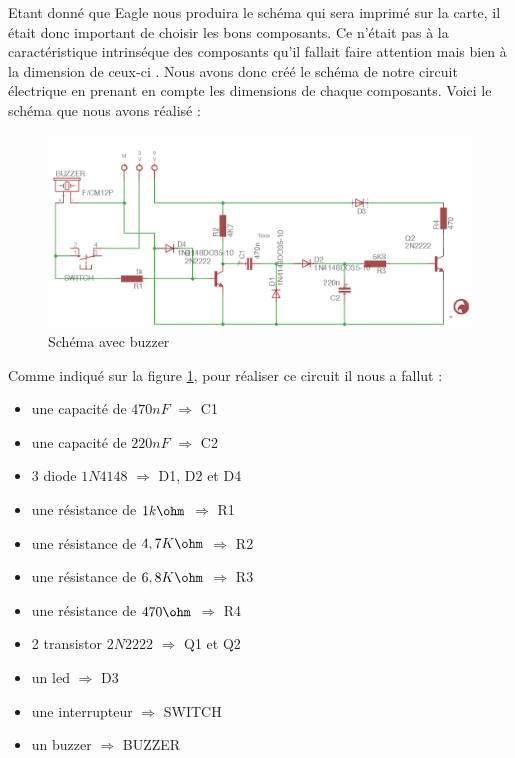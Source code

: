 Etant donné que Eagle nous produira le schéma qui sera imprimé sur la carte, il était donc important de choisir les bons composants. Ce n'était pas à la caractéristique intrinséque des composants qu'il fallait faire attention mais bien à la dimension de ceux-ci . Nous avons donc créé le schéma de notre circuit électrique en prenant en compte les dimensions de chaque composants. Voici le schéma que nous avons réalisé : 


\begin{figure}[H]
\centering
\includegraphics[width=1\textwidth]{ressources/schema_final}
\caption{Schéma avec buzzer}
\label{schemaEagle}
\end{figure}

Comme indiqué sur la figure \ref{schemaEagle}, pour réaliser ce circuit il nous a fallut :
\begin{itemize}
	\item une capacité de \textbf{$470 nF$} $\Rightarrow$ C1
	\item une capacité de \textbf{$220 nF$}  $\Rightarrow$ C2
	\item 3 diode \textbf{$1N4148$} $\Rightarrow$ D1, D2 et D4
	\item une résistance de \textbf{$ 1k\ohm $} $\Rightarrow$ R1
	\item  une résistance de \textbf{$ 4,7K\ohm $} $\Rightarrow$ R2
	\item  une résistance de \textbf{$ 6,8K\ohm $} $\Rightarrow$ R3
	\item une résistance de \textbf{$470\ohm $} $\Rightarrow$ R4
	\item 2 transistor  \textbf{$2N2222 $} $\Rightarrow$ Q1 et Q2
	\item un led $\Rightarrow$ D3
	\item une interrupteur $\Rightarrow$ SWITCH
	\item un buzzer $\Rightarrow$ BUZZER
\end{itemize}

